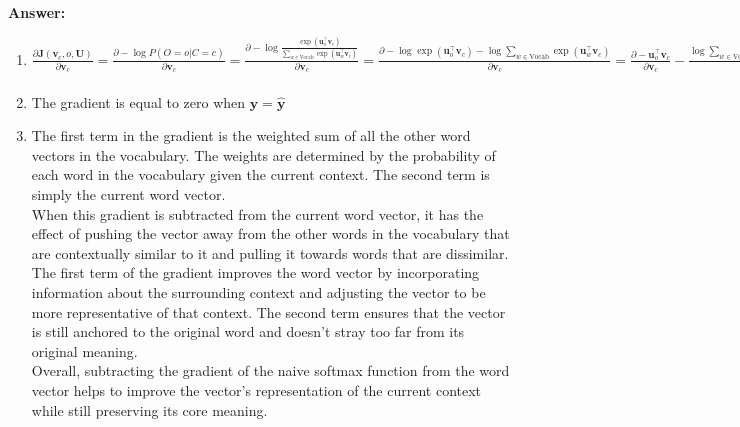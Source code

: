 \documentclass{article}
\newenvironment{answer}{
    {\bf Answer:} \sf \begingroup\color{red}
}{\endgroup}%
\begin{document}
\begin{enumerate}[label=(\alph*)]
\begin{shaded}
\begin{answer}
\begin{enumerate}[label=(\roman*)]
    \item
    $\frac{\partial \bm J(\bm v_c, o, \bm U)}{\partial \bm v_c} 
    = \frac{\partial -\log P(O=o| C=c)}{\partial \bm v_c} 
    = \frac{\partial -\log \frac{\exp(\bm u_{o}^\top \bm v_c)}{\sum_{w \in \text{Vocab}} \exp(\bm u_{w}^\top \bm v_c)}}{\partial \bm v_c} 
    = \frac{\partial -\log \exp(\bm u_{o}^\top \bm v_c) - \log \sum_{w \in \text{Vocab}} \exp(\bm u_{w}^\top \bm v_c)}{\partial \bm v_c} 
    = \frac{\partial -\bm u_{o}^\top \bm v_c}{\partial \bm v_c} - \frac{\log \sum_{w \in \text{Vocab}} \exp(\bm u_{w}^\top \bm v_c)}{\partial \bm v_c} 
    = -\bm u_{o} - \frac{1}{\sum_{w \in \text{Vocab}} \exp(\bm u_{w}^\top \bm v_c)}\frac{\sum_{w \in \text{Vocab}} \exp(\bm u_{w}^\top \bm v_c)}{\partial \bm v_c} 
    = -\bm u_{o} - \frac{1}{\sum_{w \in \text{Vocab}} \exp(\bm u_{w}^\top \bm v_c)} \sum_{w \in \text{Vocab}} \exp(\bm u_{w}^\top \bm v_c) \bm u_{w}
    = \sum_{w \in \text{Vocab}} (- \bm y_{w} \bm u_{w} + \frac{\exp(\bm u_{o}^\top \bm v_c)}{\sum_{w \in \text{Vocab}} \exp(\bm u_{w}^\top \bm v_c)} \bm u_{w}) 
    = \sum_{w \in \text{Vocab}} (- \bm y_{w} \bm u_{w} + \hat{\bm y}_{w} \bm u_{w})
    = U^\top (- \bm y_{w} + \hat{\bm y}_{w})$
    \item
    The gradient is equal to zero when $\bm y = \hat{\bm y}$
    \item
    The first term in the gradient is the weighted sum of all the other word vectors in the vocabulary. The weights are determined by the probability of each word in the vocabulary given the current context. The second term is simply the current word vector. \\
    When this gradient is subtracted from the current word vector, it has the effect of pushing the vector away from the other words in the vocabulary that are contextually similar to it and pulling it towards words that are dissimilar. The first term of the gradient improves the word vector by incorporating information about the surrounding context and adjusting the vector to be more representative of that context. The second term ensures that the vector is still anchored to the original word and doesn't stray too far from its original meaning. \\
    Overall, subtracting the gradient of the naive softmax function from the word vector helps to improve the vector's representation of the current context while still preserving its core meaning.

\end{enumerate}
\end{answer}
\end{shaded}
\end{enumerate}
\end{document}
